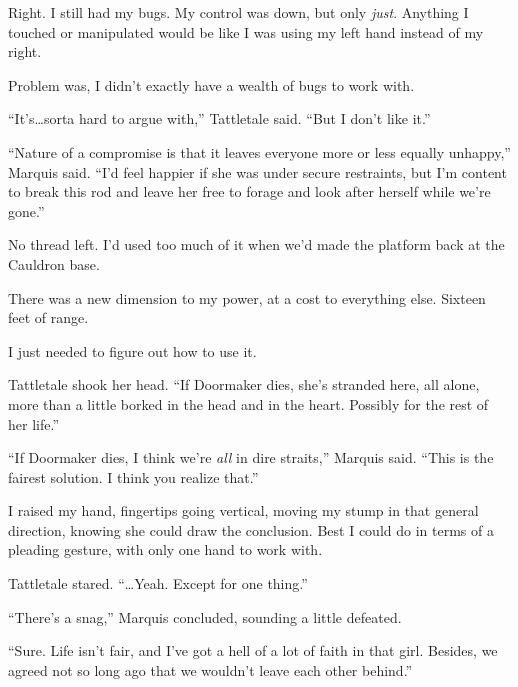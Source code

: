 Right.  I still had my bugs.  My control was down, but only \emph{just}.  Anything I touched or manipulated would be like I was using my left hand instead of my right.



Problem was, I didn't exactly have a wealth of bugs to work with.



``It's\ldots sorta hard to argue with,'' Tattletale said.  ``But I don't like it.''



``Nature of a compromise is that it leaves everyone more or less equally unhappy,'' Marquis said.  ``I'd feel happier if she was under secure restraints, but I'm content to break this rod and leave her free to forage and look after herself while we're gone.''



No thread left.  I'd used too much of it when we'd made the platform back at the Cauldron base.



There was a new dimension to my power, at a cost to everything else.  Sixteen feet of range.



I just needed to figure out how to use it.



Tattletale shook her head.  ``If Doormaker dies, she's stranded here, all alone, more than a little borked in the head and in the heart.  Possibly for the rest of her life.''



``If Doormaker dies, I think we're \emph{all} in dire straits,'' Marquis said.  ``This is the fairest solution.  I think you realize that.''



I raised my hand, fingertips going vertical, moving my stump in that general direction, knowing she could draw the conclusion.  Best I could do in terms of a pleading gesture, with only one hand to work with.



Tattletale stared.  ``\ldots{}Yeah.  Except for one thing.''



``There's a snag,'' Marquis concluded, sounding a little defeated.



``Sure.  Life isn't fair, and I've got a hell of a lot of faith in that girl.  Besides, we agreed not so long ago that we wouldn't leave each other behind.''



